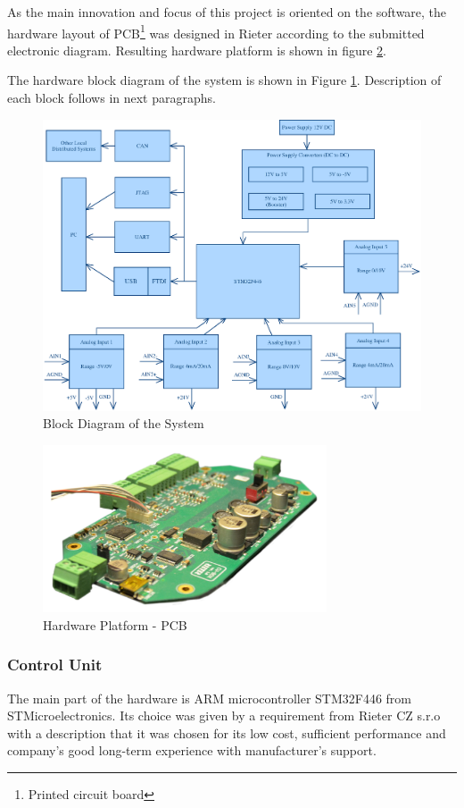 \documentclass[twoside]{ctuthesis}
\theoremstyle{plain}
\theoremstyle{definition}
\theoremstyle{note}
\begin{document}
As the main innovation and focus of this project is oriented on the software, the hardware layout of PCB\footnote{Printed circuit board} was designed in Rieter according to the submitted electronic diagram. Resulting hardware platform is shown in figure \ref{fig:cvBox_dps}.

The hardware block diagram of the system is shown in Figure \ref{fig:blockDiagram_HW}. Description of each block follows in next paragraphs.
\begin{figure}[h]
	\centering
	\includegraphics[width=1.0\textwidth]{blockSchematic4.eps}
	\caption{Block Diagram of the System}
	\label{fig:blockDiagram_HW}
\end{figure}

\begin{figure}[h]
	\centering
	\includegraphics[width=0.75\textwidth]{cvBox.jpg}
	\caption{Hardware Platform - PCB}
	\label{fig:cvBox_dps}
\end{figure}

\subsubsection{Control Unit}
\label{sec:microController}
	The main part of the hardware is ARM microcontroller STM32F446 from STMicroelectronics. Its choice was given by a requirement from Rieter CZ s.r.o with a description that it was chosen for its low cost, sufficient performance and company's good long-term experience with manufacturer's support. 
	
\end{document}
